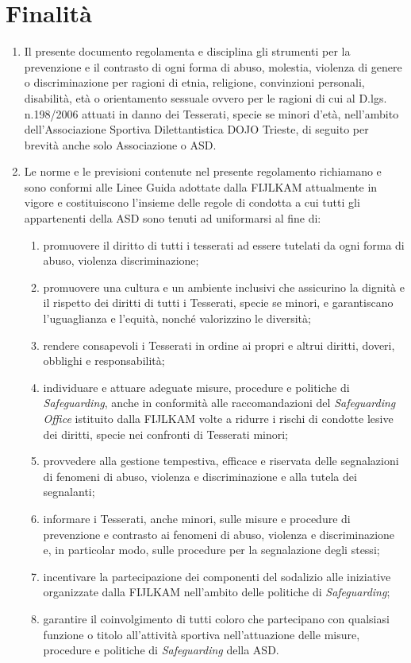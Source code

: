 \documentclass{djtsasddoc}
\begin{document}
	\section{Finalità}
	\begin{enumerate}
		\item Il presente documento regolamenta e disciplina gli strumenti per la prevenzione e il contrasto di ogni forma di abuso, molestia, violenza di genere o discriminazione per ragioni di etnia, religione, convinzioni personali, disabilità, età o orientamento sessuale ovvero per le ragioni di cui al D.lgs. n.198/2006 attuati in danno dei Tesserati, specie se minori d'età, nell'ambito dell'Associazione Sportiva Dilettantistica DOJO Trieste, di seguito per brevità anche solo Associazione o ASD.
		\item Le norme e le previsioni contenute nel presente regolamento richiamano e sono conformi alle Linee Guida adottate dalla FIJLKAM attualmente in vigore e costituiscono l'insieme delle regole di condotta a cui tutti gli appartenenti della ASD sono tenuti ad uniformarsi al fine di:
		\begin{enumerate}
			\item promuovere il diritto di tutti i tesserati ad essere tutelati da ogni forma di abuso, violenza discriminazione;
			\item promuovere una cultura e un ambiente inclusivi che assicurino la dignità e il rispetto dei diritti di tutti i Tesserati, specie se minori, e garantiscano l'uguaglianza e l'equità, nonché valorizzino le diversità;
			\item rendere consapevoli i Tesserati in ordine ai propri e altrui diritti, doveri, obblighi e responsabilità;
			\item individuare e attuare adeguate misure, procedure e politiche di \textit{Safeguarding}, anche in conformità alle raccomandazioni del \textit{Safeguarding Office} istituito dalla FIJLKAM volte a ridurre i rischi di condotte lesive dei diritti, specie nei confronti di Tesserati minori;
			\item provvedere alla gestione tempestiva, efficace e riservata delle segnalazioni di fenomeni di abuso, violenza e discriminazione e alla tutela dei segnalanti;
			\item informare i Tesserati, anche minori, sulle misure e procedure di prevenzione e contrasto ai fenomeni di abuso, violenza e discriminazione e, in particolar modo, sulle procedure per la segnalazione degli stessi;
			\item incentivare la partecipazione dei componenti del sodalizio alle iniziative organizzate dalla FIJLKAM nell'ambito delle politiche di \textit{Safeguarding};
			\item garantire il coinvolgimento di tutti coloro che partecipano con qualsiasi funzione o titolo all'attività sportiva nell'attuazione delle misure, procedure e politiche di \textit{Safeguarding} della ASD.
		\end{enumerate}
	\end{enumerate}
	
\end{document}
